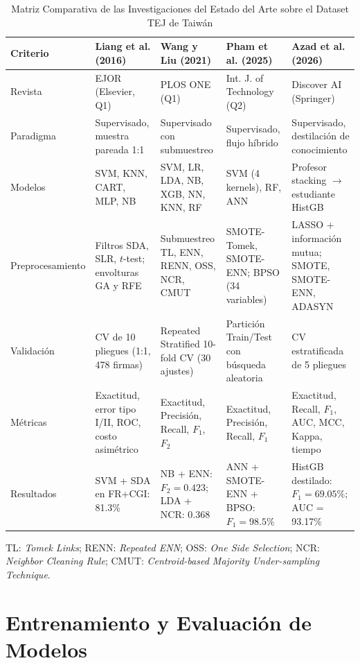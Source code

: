 \documentclass[journal]{IEEEtran}
\begin{document}
\begin{table}[!tbp]
\caption{Matriz Comparativa de las Investigaciones del Estado del Arte sobre el Dataset TEJ de Taiwán}
\label{tab:estado_arte}
\centering
\begin{tabular}{p{2.1cm}p{2.9cm}p{3.2cm}p{3.4cm}p{3.2cm}}
\toprule
\textbf{Criterio} & \textbf{Liang et al. (2016) \cite{liang2016financial}} & \textbf{Wang y Liu (2021) \cite{wang2021undersampling}} & \textbf{Pham et al. (2025) \cite{pham2025comprehensive}} & \textbf{Azad et al. (2026) \cite{azad2026predicting}} \\
\midrule
Revista & EJOR (Elsevier, Q1) & PLOS ONE (Q1) & Int. J. of Technology (Q2) & Discover AI (Springer) \\
Paradigma & Supervisado, muestra pareada 1:1 & Supervisado con submuestreo & Supervisado, flujo híbrido & Supervisado, destilación de conocimiento \\
Modelos & SVM, KNN, CART, MLP, NB & SVM, LR, LDA, NB, XGB, NN, KNN, RF & SVM (4 kernels), RF, ANN & Profesor stacking $\rightarrow$ estudiante HistGB \\
Preprocesamiento & Filtros SDA, SLR, $t$-test; envolturas GA y RFE & Submuestreo TL, ENN, RENN, OSS, NCR, CMUT & SMOTE-Tomek, SMOTE-ENN; BPSO (34 variables) & LASSO + información mutua; SMOTE, SMOTE-ENN, ADASYN \\
Validación & CV de 10 pliegues (1:1, 478 firmas) & Repeated Stratified 10-fold CV (30 ajustes) & Partición Train/Test con búsqueda aleatoria & CV estratificada de 5 pliegues \\
Métricas & Exactitud, error tipo I/II, ROC, costo asimétrico & Exactitud, Precisión, Recall, $F_1$, $F_2$ & Exactitud, Precisión, Recall, $F_1$ & Exactitud, Recall, $F_1$, AUC, MCC, Kappa, tiempo \\
Resultados & SVM + SDA en FR+CGI: 81.3\% & NB + ENN: $F_2 = 0.423$; LDA + NCR: 0.368 & ANN + SMOTE-ENN + BPSO: $F_1 = 98.5\%$ & HistGB destilado: $F_1 = 69.05\%$; AUC = 93.17\% \\
\bottomrule
\end{tabular}

\par\vspace{2pt}
{\footnotesize TL: \textit{Tomek Links}; RENN: \textit{Repeated ENN}; OSS: \textit{One Side Selection}; NCR: \textit{Neighbor Cleaning Rule}; CMUT: \textit{Centroid-based Majority Under-sampling Technique}.}
\end{table}

\section{Entrenamiento y Evaluación de Modelos}
\end{document}
